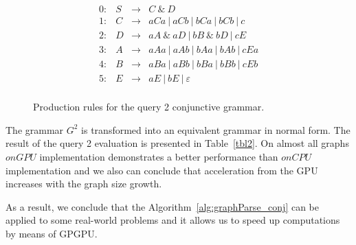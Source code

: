 \begin{figure}[h]
	\[
	\begin{array}{rccl}
	0: & S & \rightarrow & C ~\& ~ D \\ 
	1: & C & \rightarrow & aCa~|~aCb~|~bCa~|~bCb~|~c\\ 
	2: & D & \rightarrow & aA ~\& ~aD~|~bB ~\& ~bD~|~cE \\ 
	3: & A & \rightarrow & aAa~|~aAb~|~bAa~|~bAb~|~cEa\\ 
	4: & B & \rightarrow & aBa~|~aBb~|~bBa~|~bBb~|~cEb \\
	5: & E & \rightarrow & aE~|~bE~|~\varepsilon \\ 
	\end{array}
	\]
	\caption{Production rules for the query 2 conjunctive grammar.}
	\label{ProductionRulesQuery2}
\end{figure}

The grammar $G^2$ is transformed into an equivalent grammar in normal form. The result of the query 2 evaluation is presented in Table~\ref{tbl2}. On almost all graphs $onGPU$ implementation demonstrates a better performance than $onCPU$ implementation and we also can conclude that acceleration from the GPU increases with the graph size growth.

As a result, we conclude that the Algorithm~\ref{alg:graphParse_conj} can be applied to some real-world problems and it allows us to speed up computations by means of GPGPU.
